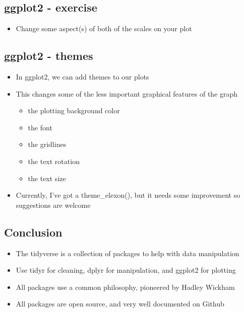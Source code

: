 \documentclass[]{article}
\providecommand{\tightlist}{%
  \setlength{\itemsep}{0pt}\setlength{\parskip}{0pt}}
\begin{document}
\subsection{ggplot2 - exercise}\label{ggplot2---exercise-1}

\begin{itemize}
\tightlist
\item
  Change some aspect(s) of both of the scales on your plot
\end{itemize}

\subsection{ggplot2 - themes}\label{ggplot2---themes}

\begin{itemize}
\tightlist
\item
  In ggplot2, we can add themes to our plots
\item
  This changes some of the less important graphical features of the
  graph

  \begin{itemize}
  \tightlist
  \item
    the plotting background color
  \item
    the font
  \item
    the gridlines
  \item
    the text rotation
  \item
    the text size
  \end{itemize}
\item
  Currently, I've got a theme\_elexon(), but it needs some improvement
  so suggestions are welcome
\end{itemize}

\subsection{Conclusion}\label{conclusion}

\begin{itemize}
\tightlist
\item
  The tidyverse is a collection of packages to help with data
  manipulation
\item
  Use tidyr for cleaning, dplyr for manipulation, and ggplot2 for
  plotting
\item
  All packages use a common philosophy, pioneered by Hadley Wickham
\item
  All packages are open source, and very well documented on Github
\end{itemize}
\end{document}
